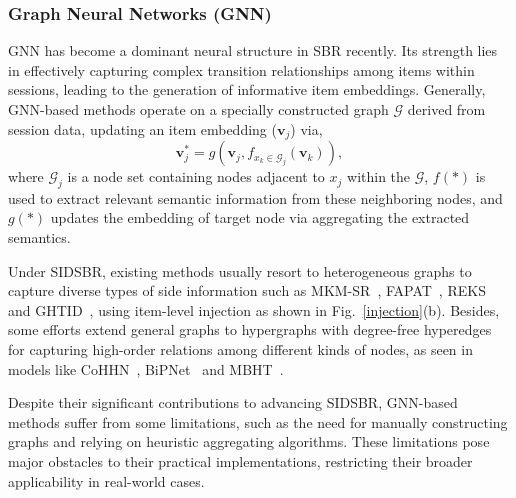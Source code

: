 \documentclass[lettersize,journal]{IEEEtran}
\newcommand{\fig}{Fig.\xspace}
\newcommand{\baby}{{SIDSBR}\xspace}
\begin{document}
\subsubsection{Graph Neural Networks (GNN)}
GNN has become a dominant neural structure in SBR recently. Its strength lies in effectively capturing complex transition relationships among items within sessions, leading to the generation of informative item embeddings. Generally, GNN-based methods operate on a specially constructed graph $\mathcal{G}$ derived from session data, updating an item embedding ($\textbf{v}_j$) via,
\begin{equation}
    \textbf{v}_j^* = g(\textbf{v}_j, f_{x_k \in \mathcal{G}_{j}}(\textbf{v}_k)),
\end{equation}
where $\mathcal{G}_{j}$ is a node set containing nodes adjacent to $x_j$ within the $\mathcal{G}$, $f(*)$ is used to extract relevant semantic information from these neighboring nodes, and $g(*)$ updates the embedding of target node via aggregating the extracted semantics. 

Under \baby, existing methods usually resort to heterogeneous graphs to capture diverse types of side information such as MKM-SR~\cite{meng@SIGIR2020}, FAPAT~\cite{Liu@NeurIPS2023}, REKS~\cite{Wu@ICDE2023} and GHTID~\cite{Li@WSDM2024}, using item-level injection as shown in \fig~\ref{injection}(b). Besides, some efforts extend general graphs to hypergraphs with degree-free hyperedges for capturing high-order relations among different kinds of nodes, as seen in models like CoHHN~\cite{CoHHN}, BiPNet~\cite{BiPNet} and MBHT~\cite{yang@KDD2022}. 

Despite their significant contributions to advancing \baby, GNN-based methods suffer from some limitations, such as the need for manually constructing graphs and relying on heuristic aggregating algorithms.  These limitations pose major obstacles to their practical implementations, restricting their broader applicability in real-world cases. 



\end{document}
